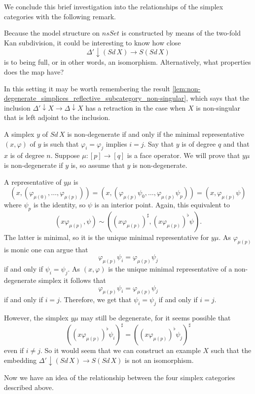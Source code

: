 We conclude this brief investigation into the relationships of the simplex categories with the following remark.
\begin{remark}
Because the model structure on $nsSet$ is constructed by means of the two-fold Kan subdivision, it could be interesting to know how close
\[\Delta '\downarrow (Sd\, X)\to S(Sd\, X)\]
is to being full, or in other words, an isomorphism. Alternatively, what properties does the map have?

In this setting it may be worth remembering the result \cref{lem:non-degenerate_simplices_reflective_subcategory_non-singular}, which says that the inclusion $\Delta '\downarrow X\to \Delta \downarrow X$ has a retraction in the case when $X$ is non-singular that is left adjoint to the inclusion.

A simplex $y$ of $Sd\, X$ is non-degenerate if and only if the minimal representative $(x,\varphi )$ of $y$ is such that $\varphi _i= \varphi _j$ implies $i=j$. Say that $y$ is of degree $q$ and that $x$ is of degree $n$. Suppose $\mu :[p]\to [q]$ is a face operator. We will prove that $y\mu$ is non-degenerate if $y$ is, so assume that $y$ is non-degenerate.

A representative of $y\mu$ is
\[(x,(\varphi _{\mu (0)},\dots ,\varphi _{\mu (p)}))=(x,(\varphi _{\mu (p)}\psi _0,\dots ,\varphi _{\mu (p)}\psi _p))=(x,\varphi _{\mu (p)}\psi )\]
where $\psi _p$ is the identity, so $\psi$ is an interior point. Again, this equivalent to
\[(x\varphi _{\mu (p)},\psi )\sim ((x\varphi _{\mu (p)})^\sharp ,(x\varphi _{\mu (p)})^\flat \psi ).\]
The latter is minimal, so it is the unique minimal representative for $y\mu$. As $\varphi _{\mu (p)}$ is monic one can argue that
\[\varphi _{\mu (p)}\psi _i=\varphi _{\mu (p)}\psi _j\]
if and only if $\psi _i=\psi _j$. As $(x,\varphi )$ is the unique minimal representative of a non-degenerate simplex it follows that
\[\varphi _{\mu (p)}\psi _i=\varphi _{\mu (p)}\psi _j\]
if and only if $i=j$. Therefore, we get that $\psi _i=\psi _j$ if and only if $i=j$.

However, the simplex $y\mu$ may still be degenerate, for it seems possible that
\[((x\varphi _{\mu (p)})^\flat \psi _i)^\sharp =((x\varphi _{\mu (p)})^\flat \psi _j)^\sharp \]
even if $i\neq j$. So it would seem that we can construct an example $X$ such that the embedding $\Delta '\downarrow (Sd\, X)\to S(Sd\, X)$ is not an isomorphism.
\end{remark}
\noindent Now we have an idea of the relationship between the four simplex categories described above.

